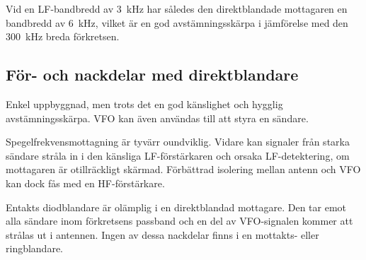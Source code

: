 Vid en LF-bandbredd av 3~kHz har således den direktblandade mottagaren
en bandbredd av 6~kHz, vilket är en god avstämningsskärpa i jämförelse
med den 300~kHz breda förkretsen.

\subsection{För- och nackdelar med direktblandare}

Enkel uppbyggnad, men trots det en god känslighet och hygglig
avstämningsskärpa.  VFO kan även användas till att styra en sändare.

Spegelfrekvensmottagning är tyvärr oundviklig. Vidare kan signaler
från starka sändare stråla in i den känsliga LF-förstärkaren och
orsaka LF-detektering, om mottagaren är otillräckligt
skärmad. Förbättrad isolering mellan antenn och VFO kan dock fås med
en HF-förstärkare.

Entakts diodblandare är olämplig i en direktblandad mottagare. Den tar
emot alla sändare inom förkretsens passband och en del av VFO-signalen
kommer att strålas ut i antennen. Ingen av dessa nackdelar finns i en
mottakts- eller ringblandare.

